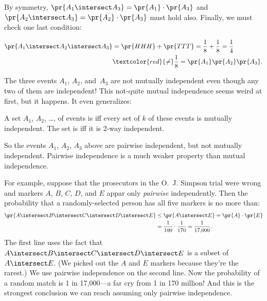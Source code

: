 By symmetry, $\pr{A_1 \intersect A_3} = \pr{A_1} \cdot \pr{A_3}$ and
$\pr{A_2 \intersect A_3} = \pr{A_2} \cdot \pr{A_3}$ must hold also.
Finally, we must check one last condition:

\begin{align*}
\pr{A_1 \intersect A_2 \intersect A_3}
        & = \pr{HHH} + \pr{TTT}
          = \frac{1}{8} + \frac{1}{8}
          = \frac{1}{4}\\
        & \textcolor{red}{\mathbf{\neq}} \frac{1}{8} = \pr{A_1} \pr{A_2} \pr{A_3}.
\end{align*}

%
The three events $A_1$, $A_2$, and~$A_3$ are not mutually independent
even though any two of them are independent!  This not-quite mutual
independence seems weird at first, but it happens.  It even
generalizes:

\begin{definition}\label{kway_independent_events}
  A set $A_1$, $A_2$, \dots, of events is 
  iff every set of $k$ of these events is mutually independent.  The
  set is  iff it is 2-way independent.
\end{definition}

So the events $A_1$, $A_2$, $A_3$ above are pairwise independent, but
not mutually independent.  Pairwise independence is a much weaker
property than mutual independence.

For example, suppose that the prosecutors in the O.~J. Simpson trial
were wrong and markers $A$, $B$, $C$, $D$, and $E$ appar only
\emph{pairwise} independently.  Then the probability that a
randomly-selected person has all five markers is no more than:
%
\begin{align*}
\pr{A \intersect B \intersect C \intersect D \intersect E}
    & \leq \pr{A \intersect E} = \pr{A} \cdot \pr{E}\\
    & = \frac{1}{100} \cdot \frac{1}{170} = \frac{1}{17{,}000}.
\end{align*}
%
The first line uses the fact that $A \intersect B \intersect C \intersect
D \intersect E$ is a subset of $A \intersect E$.  (We picked out the $A$
and $E$ markers because they're the rarest.)  We use pairwise independence
on the second line.  Now the probability of a random match is 1 in
17,000---a far cry from 1 in 170 million!  And this is the strongest
conclusion we can reach assuming only pairwise independence.

